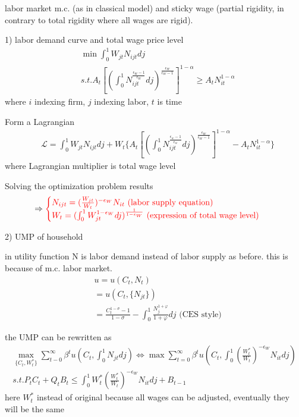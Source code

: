 \documentclass{article}
\begin{document}
labor market m.c. (as in classical model) and sticky wage (partial rigidity, in contrary to total rigidity where all wages are rigid).

1)
labor demand curve and total wage price level
\begin{equation}
\begin{split}
& \min \int_0^1 W_{jt} N_{ijt}dj
\\& s.t. A_t[(\int_0^1 N_{ijt}^{\frac{\epsilon_W-1}{\epsilon_W}}dj)^{\frac{\epsilon_W}{\epsilon_W-1}}]^{1-\alpha}\geqslant A_t N_{it}^{1-\alpha}
\end{split}
\end{equation}
where $i$ indexing firm, $j$ indexing labor, $t$ is time


Form a Lagrangian
\begin{align}
& \mathcal{L}=\int_0^1 W_{jt} N_{ijt}dj+W_t\{
A_t[(\int_0^1 N_{ijt}^{\frac{\epsilon_w-1}{\epsilon_w}}dj)^{\frac{\epsilon_W}{\epsilon_W-1}}]^{1-\alpha}-A_t N_{it}^{1-\alpha}
\}
\end{align}
where Lagrangian multiplier is total wage level

Solving the optimization problem results
\begin{align}
& \Rightarrow 
\color{red}
\begin{cases}
N_{ijt}=(\frac{W_{jt}}{W_t})^{-\epsilon_W}N_{it} \text{ (labor supply equation)}
\\
W_t=(\int_0^1 W_{jt}^{1-\epsilon_W}dj)^{\frac{1}{1-\epsilon_W}} \text{ (expression of total wage level)}
\end{cases}
\end{align}



2)
UMP of household

in utility function N is labor demand instead of labor supply as before. this is because of m.c. labor market.
\begin{equation}
\begin{split}
&u=u(C_t,N_t)
\\&=u(C_t,\{N_{jt}\})
\\&=\frac{C_t^{1-\sigma}-1}{1-\sigma}-\int_0^1 \frac{N_j^{1+\varphi}}{1+\varphi}dj \text{ (CES style)}
\end{split}
\end{equation}

the UMP can be rewritten as
\begin{equation}
\begin{split}
\max_{\{C_t,W_t^*\}} \sum\limits_{t-0}^{\infty} \beta^t u(C_t,\int_0^1 N_{jt}dj) \iff \max \sum\limits_{t=0}^{\infty} \beta^t u(C_t,\int_0^1 (\frac{W_t^*}{W_t})^{-\epsilon_W} N_{it} dj)
\\s.t. P_t C_t+Q_t B_t \leqslant \int_0^1 W_t^* (\frac{W_t^*}{W_t})^{-\epsilon_W}N_{it}dj+B_{t-1}
\end{split}
\end{equation}
here $W_t^*$ instead of original because all wages can be adjusted, eventually they will be the same
\end{document}
